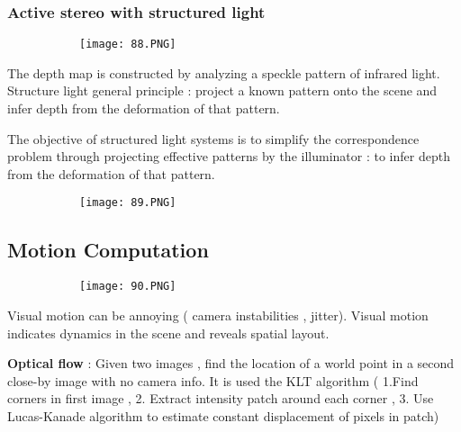 \documentclass{article}
\begin{document}
\subsubsection{Active stereo with structured light}

\begin{figure}[ht!]
  \centering
  \begin{subfigure}[b]{0.4\linewidth}
    \texttt{[image: 88.PNG]}
  \end{subfigure}
\end{figure}

The depth map is constructed by analyzing a speckle pattern of infrared light.
Structure light general principle : project a known pattern onto the scene and infer depth from the deformation of that pattern.

The objective of structured light systems is to simplify the correspondence problem through projecting effective patterns by the illuminator : to infer depth from the deformation of that pattern.

\begin{figure}[ht!]
  \centering
  \begin{subfigure}[b]{0.4\linewidth}
    \texttt{[image: 89.PNG]}
  \end{subfigure}
\end{figure}

\subsection{Motion Computation}

\begin{figure}[ht!]
  \centering
  \begin{subfigure}[b]{0.4\linewidth}
    \texttt{[image: 90.PNG]}
  \end{subfigure}
\end{figure}

Visual motion can be annoying ( camera instabilities , jitter).
Visual motion indicates dynamics in the scene and reveals spatial layout.

\textbf{Optical flow} : Given two images , find the location of a world point in a second close-by image with no camera info.
It is used the KLT algorithm ( 1.Find corners in first image , 2. Extract intensity patch around each corner , 3. Use Lucas-Kanade algorithm to estimate constant displacement of pixels in patch)
\end{document}
